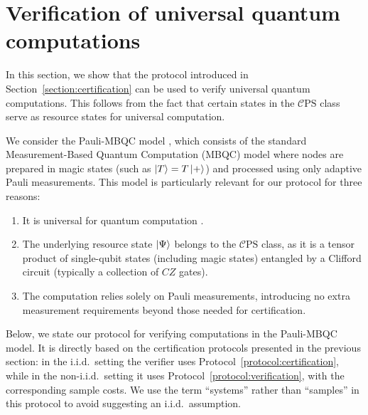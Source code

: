 \documentclass[a4paper,twocolumn,11pt,unpublished]{quantumarticle}
\newcommand{\mCEPS}{\mathcal{C}\text{PS}}
\begin{document}
    

%

\section{Verification of universal quantum computations}
\label{section:VQC}

In this section, we show that the protocol introduced in Section~\ref{section:certification} can be used to verify universal quantum computations. This follows from the fact that certain states in the $\mCEPS$ class serve as resource states for universal computation.

We consider the Pauli-MBQC model \cite{SDKO07direct}, which consists of the standard Measurement-Based Quantum Computation (MBQC) model where nodes are prepared in magic states (such as $\ket{T} = T\ket{+}$) and processed using only adaptive Pauli measurements. This model is particularly relevant for our protocol for three reasons:
\begin{enumerate}
    \item It is universal for quantum computation \cite{SDKO07direct}.
    \item The underlying resource state $\ket{\Psi}$ belongs to the $\mCEPS$ class, as it is a tensor product of single-qubit states (including magic states) entangled by a Clifford circuit (typically a collection of $CZ$ gates).
    \item The computation relies solely on Pauli measurements, introducing no extra measurement requirements beyond those needed for certification.
\end{enumerate}
Below, we state our protocol for verifying computations in the Pauli-MBQC model. It is directly based on the certification protocols presented in the previous section: in the i.i.d.\ setting the verifier uses Protocol~\ref{protocol:certification}, while in the non-i.i.d.\ setting it uses Protocol~\ref{protocol:verification}, with the corresponding sample costs. We use the term ``systems'' rather than ``samples'' in this protocol to avoid suggesting an i.i.d.\ assumption.
\end{document}
